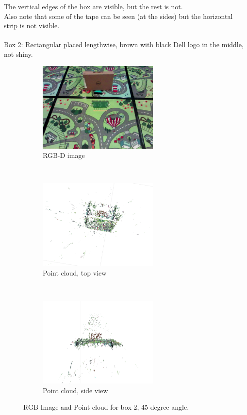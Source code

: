\documentclass[12pt,a4paper]{article}
\begin{document}
\noindent
The vertical edges of the box are visible, but the rest is not. \\
Also note that some of the tape can be seen (at the sides) but the horizontal strip is not visible.
\\\\
\newpage
\noindent
Box 2: Rectangular placed lengthwise, brown with black Dell logo in the middle, not shiny. \\
\begin{figure}[h]
  \centering
  \begin{subfigure}[t]{0.5\textwidth}
  \centering
    \includegraphics[width=60mm]{box_test/cpp-headless-output-118_4_16_1_59_18_1526435958825.png}
  \caption{RGB-D image}
  \end{subfigure}
  \\
  \begin{subfigure}[t]{0.4\textwidth}
  \centering
    \includegraphics[width=60mm, trim =70mm 50mm 50mm 10mm, clip]{box_test/no_vicon1_161_flat.png}
   \caption{Point cloud, top view}
   \end{subfigure} %
   ~
  \begin{subfigure}[t]{0.4\textwidth}
  \centering
    \includegraphics[width=60mm, trim =50mm 50mm 50mm 0mm, clip]{box_test/no_vicon1_161.png}
  \caption{Point cloud, side view}
  \end{subfigure}
  \caption{RGB Image and Point cloud for box 2, 45 degree angle.}
\end{figure}
\end{document}
